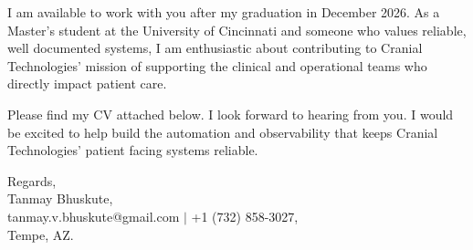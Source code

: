 \documentclass[11pt]{letter}
\begin{document}
\begin{letter}{}
I am available to work with you after my graduation in December 2026. As a Master's student at the University of Cincinnati and someone who values reliable, well documented systems, I am enthusiastic about contributing to Cranial Technologies' mission of supporting the clinical and operational teams who directly impact patient care.

Please find my CV attached below. I look forward to hearing from you. I would be excited to help build the automation and observability that keeps Cranial Technologies' patient facing systems reliable.

{\setlength{\parskip}{0pt}
Regards,\\
Tanmay Bhuskute,\\
tanmay.v.bhuskute@gmail.com $\mid$ +1 (732) 858-3027,\\
Tempe, AZ.
}

\end{letter}
\end{document}
